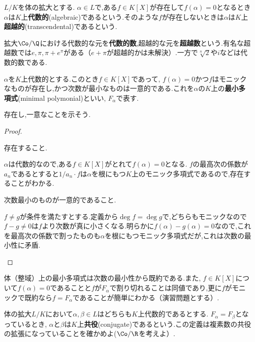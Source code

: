 \begin{defi}[代数的]
	$L/K$を体の拡大とする. $\alpha\in L$で,ある$f\in K[X]$が存在して$f(\alpha)=0$となるとき$\alpha$は$K$上\textbf{代数的}(algebraic)であるという.そのような$f$が存在しないときは$\alpha$は$K$上\textbf{超越的}(transcendental)であるという.
\end{defi}

拡大$\Co/\Q$における代数的な元を\textbf{代数的数},超越的な元を\textbf{超越数}という.有名な超越数では$e,\pi,\pi+e^\pi$がある（$e+\pi$が超越的かは未解決）.一方で$\sqrt[n]{2}$や$i$などは代数的数である.

\begin{defi}[最小多項式]
	$\alpha$を$K$上代数的とする.このとき$f\in K[X]$であって, $f(\alpha)=0$かつ$f$はモニックなものが存在し,かつ次数が最小なものは一意的である.これを$\alpha$の$K$上の\textbf{最小多項式}(minimal polymonial)といい, $F_\alpha$で表す.
\end{defi}

存在し,一意なことを示そう.
\begin{proof}
	\begin{step}
		\item 存在すること.
		
		$\alpha$は代数的なので,ある$f\in K[X]$がとれて$f(\alpha)=0$となる. $f$の最高次の係数が$a_n$であるとすると$1/a_n\cdot f$は$\alpha$を根にもつ$K$上のモニック多項式であるので,存在することがわかる.
		
		\item 次数最小のものが一意的であること.
		
		$f\neq g$が条件を満たすとする.定義から$\deg f=\deg g$で,どちらもモニックなので$f-g\neq0 $は$f$より次数が真に小さくなる.明らかに$f(\alpha)-g(\alpha)=0$なので,これを最高次の係数で割ったものも$\alpha$を根にもつモニック多項式だが,これは次数の最小性に矛盾.
	\end{step}
\end{proof}

体（整域）上の最小多項式は次数の最小性から既約である.また, $f\in K[X]$について$f(\alpha)=0$であることと$f$が$F_\alpha$で割り切れることは同値であり,更に$f$がモニックで既約なら$f=F_\alpha$であることが簡単にわかる（演習問題とする）.

体の拡大$L/K$において$\alpha,\beta\in L$はどちらも$K$上代数的であるとする. $F_\alpha=F_\beta$となっているとき, $\alpha$と$\beta$は$K$上\textbf{共役}(conjugate)であるという.この定義は複素数の共役の拡張になっていることを確かめよ($\Co/\R$を考えよ）.


